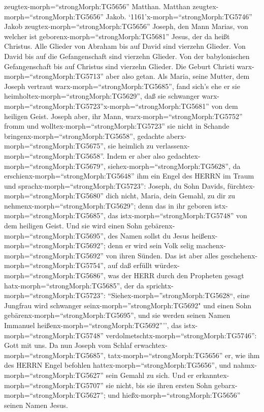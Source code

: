 zeugtex-morph=``strongMorph:TG5656'' Matthan. Matthan
zeugtex-morph=``strongMorph:TG5656'' Jakob. 
`1161'x-morph=``strongMorph:TG5746'' Jakob
zeugtex-morph=``strongMorph:TG5656'' Joseph, den Mann Marias, von
welcher ist geborenx-morph=``strongMorph:TG5681'' Jesus, der da heißt
Christus.  Alle Glieder von Abraham bis auf David sind
vierzehn Glieder. Von David bis auf die Gefangenschaft sind vierzehn
Glieder. Von der babylonischen Gefangenschaft bis auf Christus sind
vierzehn Glieder.  Die Geburt Christi
warx-morph=``strongMorph:TG5713'' aber also getan. Als Maria, seine
Mutter, dem Joseph vertraut warx-morph=``strongMorph:TG5685'', fand
sich's ehe er sie heimholtex-morph=``strongMorph:TG5629'', daß sie
schwanger
warx-morph=``strongMorph:TG5723''x-morph=``strongMorph:TG5681'' von dem
heiligen Geist.  Joseph aber, ihr Mann,
warx-morph=``strongMorph:TG5752'' fromm und
wolltex-morph=``strongMorph:TG5723'' sie nicht in Schande
bringenx-morph=``strongMorph:TG5658'', gedachte
aberx-morph=``strongMorph:TG5675'', sie heimlich zu
verlassenx-morph=``strongMorph:TG5658''.  Indem er aber
also gedachtex-morph=``strongMorph:TG5679'',
siehex-morph=``strongMorph:TG5628'', da
erschienx-morph=``strongMorph:TG5648'' ihm ein Engel des HERRN im Traum
und sprachx-morph=``strongMorph:TG5723'': Joseph, du Sohn Davids,
fürchtex-morph=``strongMorph:TG5680'' dich nicht, Maria, dein Gemahl, zu
dir zu nehmenx-morph=``strongMorph:TG5629''; denn das in ihr geboren
istx-morph=``strongMorph:TG5685'', das istx-morph=``strongMorph:TG5748''
von dem heiligen Geist.  Und sie wird einen Sohn
gebärenx-morph=``strongMorph:TG5695'', des Namen sollst du Jesus
heißenx-morph=``strongMorph:TG5692''; denn er wird sein Volk selig
machenx-morph=``strongMorph:TG5692'' von ihren Sünden.  Das
ist aber alles geschehenx-morph=``strongMorph:TG5754'', auf daß erfüllt
würdex-morph=``strongMorph:TG5686'', was der HERR durch den Propheten
gesagt hatx-morph=``strongMorph:TG5685'', der da
sprichtx-morph=``strongMorph:TG5723'': 
``Siehex-morph=''strongMorph:TG5628``, eine Jungfrau wird schwanger
seinx-morph=''strongMorph:TG5692" und einen Sohn
gebärenx-morph=``strongMorph:TG5695'', und sie werden seinen Namen
Immanuel heißenx-morph=``strongMorph:TG5692'''', das
istx-morph=``strongMorph:TG5748''
verdolmetschtx-morph=``strongMorph:TG5746'': Gott mit uns. 
Da nun Joseph vom Schlaf erwachtex-morph=``strongMorph:TG5685'',
tatx-morph=``strongMorph:TG5656'' er, wie ihm des HERRN Engel befohlen
hattex-morph=``strongMorph:TG5656'', und
nahmx-morph=``strongMorph:TG5627'' sein Gemahl zu sich. 
Und er erkanntex-morph=``strongMorph:TG5707'' sie nicht, bis sie ihren
ersten Sohn gebarx-morph=``strongMorph:TG5627''; und
hießx-morph=``strongMorph:TG5656'' seinen Namen Jesus.

